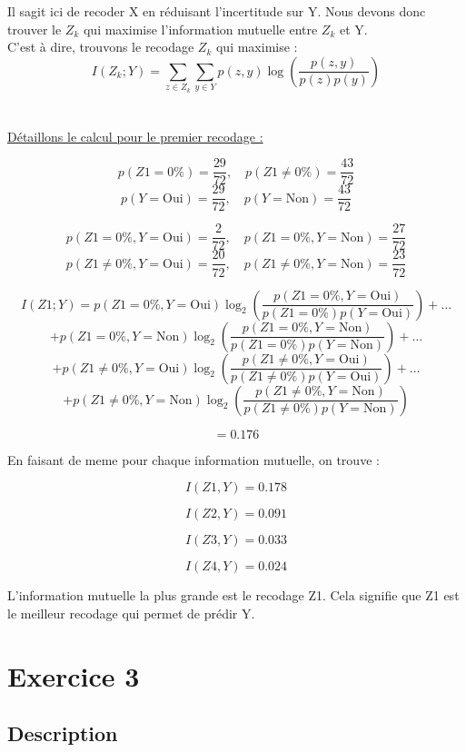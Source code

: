 \documentclass{article}
\begin{document}
Il sagit ici de recoder X en réduisant l'incertitude sur Y.
Nous devons donc trouver le $Z_k$ qui maximise l'information mutuelle entre $Z_k$ et Y.
\\
C'est à dire, trouvons le recodage $Z_k$ qui maximise :
\[
I(Z_k; Y) = \sum_{z\in Z_k} \sum_{y \in Y} p(z, y) \log \left( \frac{p(z, y)}{p(z)p(y)} \right)
\]
\\
\\
\underline{Détaillons le calcul pour le premier recodage :}


\[
p(Z1 = 0\%) = \frac{29}{72}, \quad p(Z1 \neq 0\%) = \frac{43}{72}
\]
\[
p(Y = \text{Oui}) = \frac{29}{72}, \quad p(Y = \text{Non}) = \frac{43}{72}
\]


\[
p(Z1 = 0\%, Y = \text{Oui}) = \frac{2}{72}, \quad p(Z1 = 0\%, Y = \text{Non}) = \frac{27}{72}
\]
\[
p(Z1 \neq 0\%, Y = \text{Oui}) = \frac{20}{72}, \quad p(Z1 \neq 0\%, Y = \text{Non}) = \frac{23}{72}
\]

\[
I(Z1; Y) = p(Z1 = 0\%, Y = \text{Oui}) \log_2 \left(\frac{p(Z1 = 0\%, Y = \text{Oui})}{p(Z1 = 0\%) p(Y = \text{Oui})}\right) + \ldots
\]
\[
+ p(Z1 = 0\%, Y = \text{Non}) \log_2 \left(\frac{p(Z1 = 0\%, Y = \text{Non})}{p(Z1 = 0\%) p(Y = \text{Non})}\right) + \ldots
\]
\[
+ p(Z1 \neq 0\%, Y = \text{Oui}) \log_2 \left(\frac{p(Z1 \neq 0\%, Y = \text{Oui})}{p(Z1 \neq 0\%) p(Y = \text{Oui})}\right) + \ldots
\]
\[
+ p(Z1 \neq 0\%, Y = \text{Non}) \log_2 \left(\frac{p(Z1 \neq 0\%, Y = \text{Non})}{p(Z1 \neq 0\%) p(Y = \text{Non})}\right)
\]

\[
= 0.176
\]




En faisant de meme pour chaque information mutuelle, on trouve : 

\[
I(Z1,Y) = 0.178
\]

\[
I(Z2,Y) = 0.091
\]

\[
I(Z3,Y) = 0.033
\]

\[
I(Z4,Y) = 0.024
\]

L'information mutuelle la plus grande est le recodage Z1.
Cela signifie que Z1 est le meilleur recodage qui permet de prédir Y.


\newpage
\section{Exercice 3}
\subsection{Description}
\end{document}
